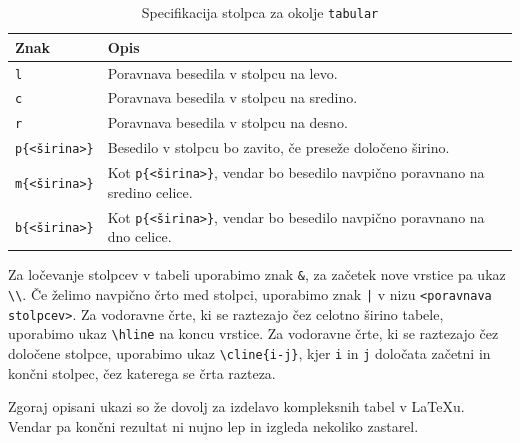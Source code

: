 \begin{table}
\centering
\caption[]{Specifikacija stolpca za okolje \texttt{tabular}}
\label{tab-specifikacija-stolpca}
\begin{tabular}{p{}p{}}
\toprule
Znak & Opis \\
\hline
\texttt{l} & Poravnava besedila v stolpcu na levo. \\
\texttt{c} & Poravnava besedila v stolpcu na sredino. \\
\texttt{r} & Poravnava besedila v stolpcu na desno. \\
\texttt{p\{\textless širina\textgreater \}} & Besedilo v stolpcu bo zavito, če preseže določeno širino. \\
\texttt{m\{\textless širina\textgreater \}} & Kot \texttt{p\{\textless širina\textgreater \}}, vendar bo besedilo navpično poravnano na sredino celice. \\
\texttt{b\{\textless širina\textgreater \}} & Kot \texttt{p\{\textless širina\textgreater \}}, vendar bo besedilo navpično poravnano na dno celice. \\
\bottomrule
\end{tabular}
\end{table}

\begin{example}\end{example}\begin{example}\label{latexuvod_tabular-poravnava}\end{example}\begin{example}\end{example}Za ločevanje stolpcev v tabeli uporabimo znak \texttt{\&}, za začetek nove vrstice pa ukaz \texttt{{\textbackslash}{\textbackslash}}.
Če želimo navpično črto med stolpci, uporabimo znak \texttt{|} v nizu \texttt{\textless poravnava stolpcev\textgreater }.
Za vodoravne črte, ki se raztezajo čez celotno širino tabele, uporabimo ukaz \texttt{{\textbackslash}hline} na koncu vrstice.
Za vodoravne črte, ki se raztezajo čez določene stolpce, uporabimo ukaz \texttt{{\textbackslash}cline\{i-j\}}, kjer \texttt{i} in \texttt{j} določata začetni in končni stolpec, čez katerega se črta razteza.

\begin{example}\end{example}Zgoraj opisani ukazi so že dovolj za izdelavo kompleksnih tabel v LaTeXu. Vendar pa končni rezultat ni nujno lep in izgleda nekoliko zastarel.

